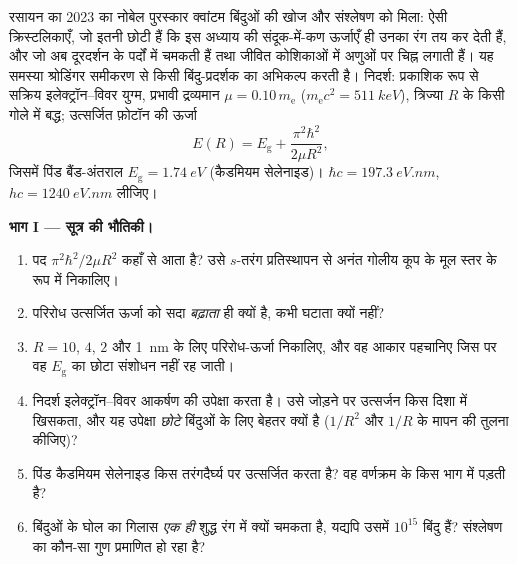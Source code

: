 \begin{problem}\label{pb:b3:schrodinger-three-dimensions:1}
रसायन का 2023 का नोबेल पुरस्कार क्वांटम बिंदुओं की खोज और संश्लेषण को
मिला: ऐसी क्रिस्टलिकाएँ, जो इतनी छोटी हैं कि इस अध्याय की
संदूक-में-कण ऊर्जाएँ ही उनका रंग तय कर देती हैं, और जो अब दूरदर्शन के
पर्दों में चमकती हैं तथा जीवित कोशिकाओं में अणुओं पर चिह्न लगाती हैं।
यह समस्या श्रोडिंगर समीकरण से किसी बिंदु-प्रदर्शक का अभिकल्प करती है।
निदर्श: प्रकाशिक रूप से सक्रिय इलेक्ट्रॉन--विवर युग्म, प्रभावी
द्रव्यमान $\mu = 0.10\,m_{\text{e}}$
($m_{\text{e}}c^2 = \qty{511}{keV}$), त्रिज्या $R$ के किसी गोले में
बद्ध; उत्सर्जित फ़ोटॉन की ऊर्जा
\[
E(R) = E_{\text{g}} + \frac{\pi^2\hbar^2}{2\mu R^2} ,
\]
जिसमें पिंड बैंड-अंतराल $E_{\text{g}} = \qty{1.74}{eV}$ (कैडमियम
सेलेनाइड)। $\hbar c = \qty{197.3}{eV.nm}$, $hc =
\qty{1240}{eV.nm}$ लीजिए।

\medskip\noindent\textbf{भाग I --- सूत्र की भौतिकी।}
\begin{enumerate}
  \item पद $\pi^2\hbar^2/2\mu R^2$ कहाँ से आता है? उसे
        $s$-तरंग प्रतिस्थापन से अनंत गोलीय कूप के मूल स्तर के रूप में
        निकालिए।
  \item परिरोध उत्सर्जित ऊर्जा को सदा \emph{बढ़ाता} ही क्यों है,
        कभी घटाता क्यों नहीं?
  \item $R = 10$, $4$, $2$ और \qty{1}{nm} के लिए परिरोध-ऊर्जा
        निकालिए, और वह आकार पहचानिए जिस पर वह $E_{\text{g}}$ का
        छोटा संशोधन नहीं रह जाती।
  \item निदर्श इलेक्ट्रॉन--विवर आकर्षण की उपेक्षा करता है। उसे जोड़ने
        पर उत्सर्जन किस दिशा में खिसकता, और यह उपेक्षा
        \emph{छोटे} बिंदुओं के लिए बेहतर क्यों है ($1/R^2$ और
        $1/R$ के मापन की तुलना कीजिए)?
  \item पिंड कैडमियम सेलेनाइड किस तरंगदैर्घ्य पर उत्सर्जित करता है?
        वह वर्णक्रम के किस भाग में पड़ती है?
  \item बिंदुओं के घोल का गिलास \emph{एक ही} शुद्ध रंग में क्यों
        चमकता है, यद्यपि उसमें $10^{15}$ बिंदु हैं? संश्लेषण का
        कौन-सा गुण प्रमाणित हो रहा है?
\end{enumerate}


\end{problem}
